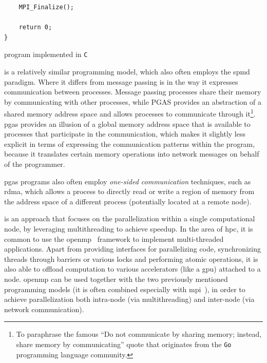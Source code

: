 \begin{description}[wide=0pt]
\begin{listing}[h]
\begin{verbatim}
	MPI_Finalize();

	return 0;
}
		  	\end{verbatim}
			\caption{ program implemented in \texttt{C}}
			\label{lst:mpi-example}
		\end{listing}

	\item[\gls{pgas}~\cite{pgas}] is a relatively similar programming model, which also often employs the \gls{spmd}
		paradigm. Where it differs from message passing is in the way it expresses communication between
		processes. Message passing processes share their memory by communicating with other processes,
		while PGAS provides an abstraction of a shared memory address space and allows processes to
		communicate through it\footnote{To paraphrase the famous ``Do not communicate by sharing memory; instead, share memory by communicating'' quote that originates from the \texttt{Go} programming
		language community.}. \gls{pgas} provides an illusion of a
		global memory address space that is available to processes that participate in the communication,
		which makes it slightly less explicit in terms of expressing the communication patterns within the
		program, because it translates certain memory operations into network messages on behalf of the
		programmer.

		\gls{pgas} programs also often employ \emph{one-sided communication} techniques, such
		as \gls{rdma}, which allows a process to directly read or write a region of memory from
		the address space of a different process (potentially located at a remote node).

	\item[Shared-memory multiprocessing] is an approach that focuses on the parallelization within a single computational node, by
		leveraging multithreading to achieve speedup. In the area of \gls{hpc}, it is common
		to use the \gls{openmp}~\cite{openmp} framework to implement multi-threaded
		applications. Apart from providing interfaces for parallelizing code, synchronizing threads through
		barriers or various locks and performing atomic operations, it is also able to offload computation
		to various accelerators (like a \gls{gpu}) attached to a node. \gls{openmp}
		can be used together with the two previously mentioned programming models (it is often combined
		especially with \gls{mpi}~\cite{hybrid_openmp_mpi}), in order to achieve parallelization
		both intra-node (via multithreading) and inter-node (via network communication).


\end{description}
